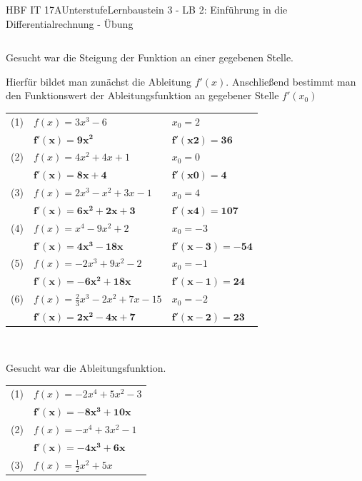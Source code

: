 \documentclass[oneside,openany,headings=optiontotoc,11pt,numbers=noenddot]{scrreprt}
\begin{document}
\begin{worksheet}{HBF IT 17A}{Unterstufe}{Lernbaustein 3 - LB 2: Einführung in die Differentialrechnung - Übung}
\begin{framed}
\begin{center}
\begin{tabularx}{\textwidth}{XX}
				\end{tabularx}
			\end{center}
		\end{framed}
		\newpage
		\begin{framed}
			\noindent
			Gesucht war die Steigung der Funktion an einer gegebenen Stelle.\\
			\par\noindent
			Hierfür bildet man zunächst die Ableitung \(f'(x)\). Anschließend bestimmt man den Funktionswert der Ableitungsfunktion an gegebener Stelle \(f'(x_0)\)
			\par\noindent
			\begin{tabularx}{\textwidth}{lXX}
				(1) & \(f(x) = 3x^3-6\) & \(x_0 = 2\) \\
				 & \(\mathbf{f'(x) = 9x^2}\) & \(\mathbf{f'(x2) = 36}\)\\
				(2) & \(f(x) = 4x^2 +4x +1\) & \( x_0 = 0\)\\
				& \(\mathbf{f'(x) = 8x+4}\) & \(\mathbf{f'(x0) = 4}\)\\
				(3) & \(f(x) = 2x^3-x^2+3x-1\) & \(x_0 = 4\)\\
				& \(\mathbf{f'(x) = 6x^2+2x+3}\) & \(\mathbf{f'(x4) = 107}\)\\
				(4) & \(f(x) = x^4-9x^2+2\) & \(x_0 = -3\)\\
				& \(\mathbf{f'(x) = 4x^3-18x}\) & \(\mathbf{f'(x-3) = -54}\)\\
				(5) & \(f(x)=-2x^3+9x^2-2\) & \(x_0=-1\)\\
				& \(\mathbf{f'(x) = -6x^2+18x}\) & \(\mathbf{f'(x-1) = 24}\)\\
				(6) & \(f(x) = \frac{2}{3}x^3 -2x^2+7x -15\) & \(x_0=-2\)\\
				& \(\mathbf{f'(x) = 2x^2 -4x +7}\) & \(\mathbf{f'(x-2) = 23}\)
			\end{tabularx}\\
			\par\bigskip\noindent
			Gesucht war die Ableitungsfunktion.\\
			\par\noindent
			\begin{tabularx}{\textwidth}{lX}
				(1) & \(f(x) = -2x^4+5x^2-3\)\\
				& \(\mathbf{f'(x) = -8x^3+10x}\)\\
				(2) & \(f(x) = -x^4+3x^2-1\)\\
				& \(\mathbf{f'(x) = -4x^3+6x}\)\\
				(3) & \(f(x) = \frac{1}{2}x^2+5x\)\\

\end{tabularx}
\end{framed}
\end{worksheet}
\end{document}
